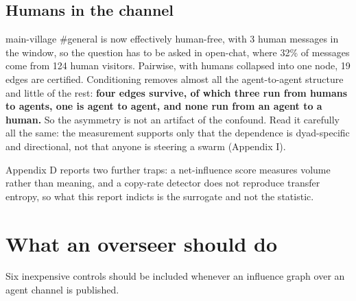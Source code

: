 \documentclass[11pt]{article}
\begin{document}
\subsection{Humans in the channel}

main-village \#general is now effectively human-free, with 3 human messages in the window, so the question has to be asked in open-chat, where 32\% of messages come from 124 human visitors. Pairwise, with humans collapsed into one node, 19 edges are certified. Conditioning removes almost all the agent-to-agent structure and little of the rest: \textbf{four edges survive, of which three run from humans to agents, one is agent to agent, and none run from an agent to a human.} So the asymmetry is not an artifact of the confound. Read it carefully all the same: the measurement supports only that the dependence is dyad-specific and directional, not that anyone is steering a swarm (Appendix I).

Appendix D reports two further traps: a net-influence score measures volume rather than meaning, and a copy-rate detector does not reproduce transfer entropy, so what this report indicts is the surrogate and not the statistic.

\section{What an overseer should do}

Six inexpensive controls should be included whenever an influence graph over an agent channel is published.
\end{document}

